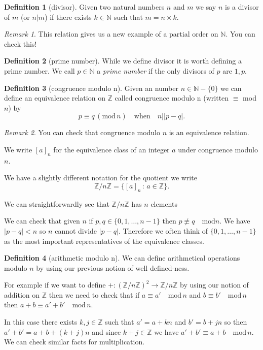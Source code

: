 \documentclass[
]{book}
\theoremstyle{definition}
\newtheorem{definition}{Definition}[chapter]
\theoremstyle{definition}
\theoremstyle{definition}
\theoremstyle{definition}
\theoremstyle{remark}
\newtheorem*{remark}{Remark}
\begin{document}
\begin{definition}[divisor]
Given two natural numbers \(n\) and \(m\) we say \(n\) is a divisor of \(m\) (or \(n|m\)) if there exists \(k \in \mathbb{N}\) such that \(m=n\times k\).
\end{definition}

\begin{remark}
This relation gives us a new example of a partial order on \(\mathbb{N}\). You can check this!
\end{remark}

\begin{definition}[prime number]
While we define divisor it is worth defining a prime number. We call \(p \in \mathbb{N}\) a \emph{prime number} if the only divisors of \(p\) are \(1, p\).
\end{definition}

\begin{definition}[congruence modulo n]
Given an number \(n \in \mathbb{N}-\{0\}\) we can define an equivalence relation on \(\mathbb{Z}\) called congruence modulo n (written \(\equiv\) mod \(n\)) by
\[ p \equiv   q \, (\mbox{mod} \, n) \quad \mbox{when} \quad n\Big| |p-q|.   \]
\end{definition}

\begin{remark}
You can check that congruence modulo \(n\) is an equivalence relation.

We write \([a]_n\) for the equivalence class of an integer \(a\) under congruence modulo \(n\).

We have a slightly different notation for the quotient we write
\[ \mathbb{Z}/n\mathbb{Z} = \{ [a]_n \,:\, a \in \mathbb{Z}\}.  \]

We can straightforwardly see that \(\mathbb{Z}/n\mathbb{Z}\) has \(n\) elements
\end{remark}

We can check that given \(n\) if \(p,q \in \{0,1, \dots, n-1\}\) then \(p \not\equiv q \quad \mbox{mod} n\). We have \(|p-q| < n\) so \(n\) cannot divide \(|p-q|\). Therefore we often think of \(\{0, 1, \dots, n-1\}\) as the most important representatives of the equivalence classes.

\begin{definition}[arithmetic modulo n]
We can define arithmetical operations modulo \(n\) by using our previous notion of well defined-ness.

For example if we want to define \(+: (\mathbb{Z}/n\mathbb{Z})^2 \rightarrow \mathbb{Z}/n\mathbb{Z}\) by using our notion of addition on \(\mathbb{Z}\) then we need to check that if \(a\equiv a' \quad \mbox{mod} \, n\) and \(b \equiv b' \quad \mbox{mod} \, n\) then \(a+b \equiv a'+b' \quad \mbox{mod} \, n\).

In this case there exists \(k, j \in \mathbb{Z}\) such that \(a' = a + k n\) and \(b' = b + j n\) so then \(a'+b' = a+b + (k+j)n\) and since \(k + j \in \mathbb{Z}\) we have \(a'+b' \equiv a+b \quad \mbox{mod} \, n\). We can check similar facts for multiplication.
\end{definition}
\end{document}
